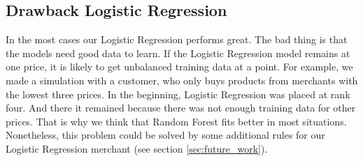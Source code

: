 \subsection{Drawback Logistic Regression}
    In the most cases our Logistic Regression performs great. The bad thing is that the models need good data to learn. If the Logistic Regression model remains at one price, it is likely to get unbalanced training data at a point. For example, we made a simulation with a customer, who only buys products from merchants with the lowest three prices. In the beginning, Logistic Regression was placed at rank four. And there it remained because there was not enough training data for other prices. That is why we think that Random Forest fits better in most situations. Nonetheless, this problem could be solved by some additional rules for our Logistic Regression merchant (see section \ref{sec:future_work}).
